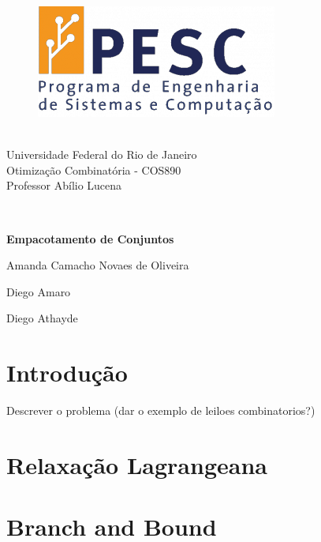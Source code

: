 \documentclass{article}
\begin{document}
	\begin{figure}
		\begin{flushleft}	
			\includegraphics[height=.065\textheight]{PESC.png}
		\end{flushleft}
	\end{figure}
	
	\quad\\
	{Universidade Federal do Rio de Janeiro} \\
	{Otimização Combinatória - COS890} \\
	{Professor Abílio Lucena}
	
	\quad\\
	\vspace*{2cm}
	
	\begin{center}
		\huge\bfseries
		Empacotamento de Conjuntos
	\end{center}
	\vspace*{3mm}
	
	\begin{center}
		\large
		Amanda Camacho Novaes de Oliveira
		
		Diego Amaro	
		
		Diego Athayde 
	\end{center}

	\vspace{1cm}
	
	\section{Introdução}
	Descrever o problema (dar o exemplo de leiloes combinatorios?)
	
	
	
	\section{Relaxação Lagrangeana}
	
	\section{Branch and Bound}
	
\end{document}
